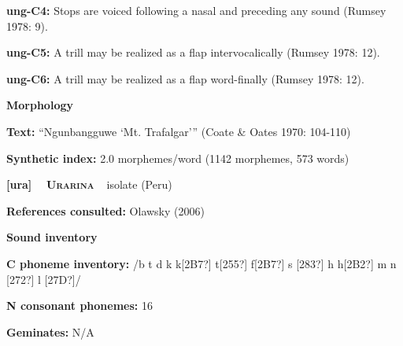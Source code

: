 \begin{styleBody}
\textbf{ung-C4: }Stops are voiced following a nasal and preceding any sound (Rumsey 1978: 9).
\end{styleBody}

\begin{styleBody}
\textbf{ung-C5: }A trill may be realized as a flap intervocalically (Rumsey 1978: 12).
\end{styleBody}

\begin{styleBody}
\textbf{ung-C6: }A trill may be realized as a flap word-finally (Rumsey 1978: 12).
\end{styleBody}

\begin{styleBody}
\textbf{Morphology}
\end{styleBody}

\begin{styleBody}
\textbf{Text:} “Ngunbangguwe ‘Mt. Trafalgar’” (Coate \& Oates 1970: 104-110)
\end{styleBody}

\begin{styleBody}
\textbf{Synthetic index: }2.0 morphemes/word (1142 morphemes, 573 words)
\end{styleBody}

\clearpage\begin{styleBody}
\textbf{[ura] }\ \ \textbf{\textsc{Urarina}}\textbf{\ \ }isolate (Peru)
\end{styleBody}

\begin{styleBody}
\textbf{References consulted: }Olawsky (2006)
\end{styleBody}

\begin{styleBody}
\textbf{Sound inventory}
\end{styleBody}

\begin{styleBody}
\textbf{C phoneme inventory:} /b t d k k[2B7?] t[255?] f[2B7?] s [283?] h h[2B2?] m n [272?] l [27D?]/
\end{styleBody}

\begin{styleBody}
\textbf{N consonant phonemes:} 16
\end{styleBody}

\begin{styleBody}
\textbf{Geminates:} N/A
\end{styleBody}


